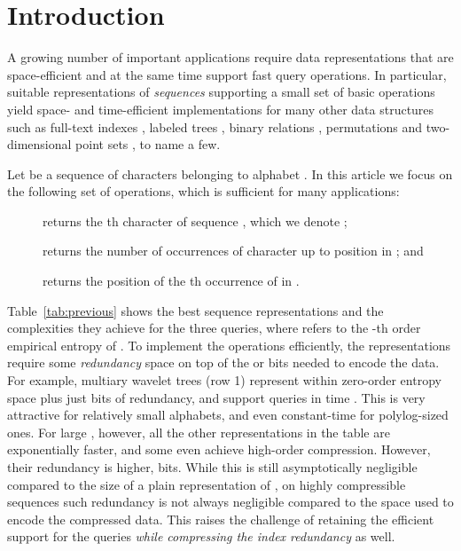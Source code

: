 \documentclass[11pt]{article}
\begin{document}
\section{Introduction} \label{sec:introduction}

A growing number of important applications require data
representations that are space-efficient and at the same time support
fast query operations.  In particular, suitable representations of
{\em sequences} supporting a small set of basic operations yield
space- and time-efficient implementations for many other data
structures such as full-text indexes \cite{GGV03,GMR06,FMMN07,NM07},
labeled trees \cite{BHMR07,BGMR07,FLMM09}, binary relations
\cite{BHMR07,BCN10}, permutations \cite{BN09} and two-dimensional
point sets \cite{MN07,BLNS09}, to name a few.

Let  be a sequence of characters belonging to alphabet
.  In this article we focus on the following set of
operations, which is sufficient for many applications:
\begin{description}
\item[] returns the th character of sequence ,
  which we denote ;
\item[] returns the number of occurrences of
  character  up to position  in ; and
\item[] returns the position of the th
  occurrence of  in .
\end{description}

Table~\ref{tab:previous} shows the best sequence representations and
the complexities they achieve for the three queries, where 
refers to the -th order empirical entropy of  \cite{Man01}. To
implement the operations efficiently, the representations require some
{\em redundancy} space on top of the  or  bits
needed to encode the data.
For example, multiary wavelet trees (row 1) represent  within
zero-order entropy space plus just  bits of redundancy, and
support queries in time . This is
very attractive for relatively small alphabets, and even constant-time
for polylog-sized ones. For large , however, all the other
representations in the table are exponentially faster, and some even
achieve high-order compression. However, their redundancy is higher,
 bits. While this is still asymptotically negligible
compared to the size of a plain representation of , on highly
compressible sequences such redundancy is not always negligible
compared to the space used to encode the compressed data. This raises
the challenge of retaining the efficient support for the queries {\em
  while compressing the index redundancy} as well.
\end{document}
